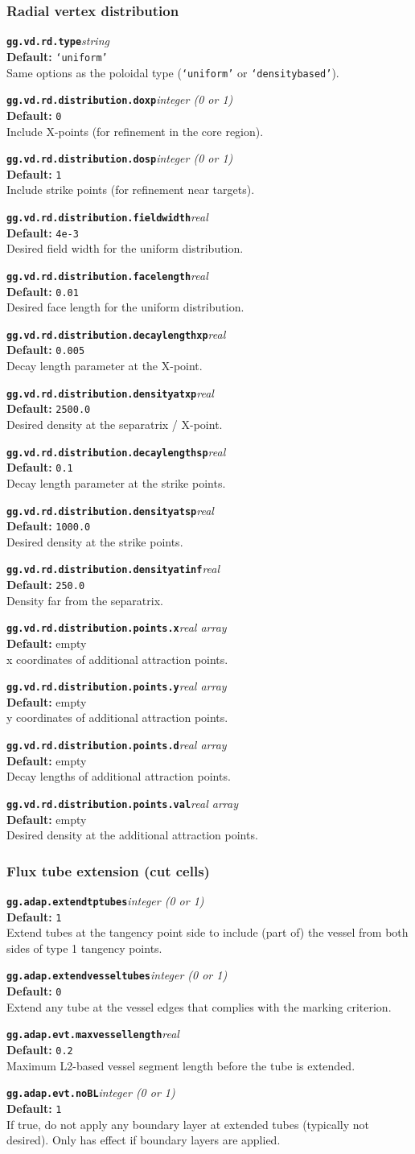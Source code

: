 \documentclass[10pt,a4paper]{article}
\newcommand{\sw}[4]{%
  \par\vspace{0.7em}%
  \begin{minipage}{\linewidth}\raggedright
    \textbf{\texttt{#1}}\hfill\textit{#2}\\[0.1em]
    \textbf{Default:} #3\\[0.1em]
    #4\par
    \vspace{0.3em}{\color{swgrey}\hrule}
  \end{minipage}\par}
\begin{document}
\subsubsection*{Radial vertex distribution}
\sw{gg.vd.rd.type}{string}{\texttt{`uniform'}}{Same options as the poloidal type (\texttt{`uniform'} or \texttt{`densitybased'}).}
\sw{gg.vd.rd.distribution.doxp}{integer (0 or 1)}{\texttt{0}}{Include X-points (for refinement in the core region).}
\sw{gg.vd.rd.distribution.dosp}{integer (0 or 1)}{\texttt{1}}{Include strike points (for refinement near targets).}
\sw{gg.vd.rd.distribution.fieldwidth}{real}{\texttt{4e-3}}{Desired field width for the uniform distribution.}
\sw{gg.vd.rd.distribution.facelength}{real}{\texttt{0.01}}{Desired face length for the uniform distribution.}
\sw{gg.vd.rd.distribution.decaylengthxp}{real}{\texttt{0.005}}{Decay length parameter at the X-point.}
\sw{gg.vd.rd.distribution.densityatxp}{real}{\texttt{2500.0}}{Desired density at the separatrix / X-point.}
\sw{gg.vd.rd.distribution.decaylengthsp}{real}{\texttt{0.1}}{Decay length parameter at the strike points.}
\sw{gg.vd.rd.distribution.densityatsp}{real}{\texttt{1000.0}}{Desired density at the strike points.}
\sw{gg.vd.rd.distribution.densityatinf}{real}{\texttt{250.0}}{Density far from the separatrix.}
\sw{gg.vd.rd.distribution.points.x}{real array}{empty}{x coordinates of additional attraction points.}
\sw{gg.vd.rd.distribution.points.y}{real array}{empty}{y coordinates of additional attraction points.}
\sw{gg.vd.rd.distribution.points.d}{real array}{empty}{Decay lengths of additional attraction points.}
\sw{gg.vd.rd.distribution.points.val}{real array}{empty}{Desired density at the additional attraction points.}

\subsubsection*{Flux tube extension (cut cells)}
\sw{gg.adap.extendtptubes}{integer (0 or 1)}{\texttt{1}}{Extend tubes at the tangency point side to include (part of) the vessel from both sides of type 1 tangency points.}
\sw{gg.adap.extendvesseltubes}{integer (0 or 1)}{\texttt{0}}{Extend any tube at the vessel edges that complies with the marking criterion.}
\sw{gg.adap.evt.maxvessellength}{real}{\texttt{0.2}}{Maximum L2-based vessel segment length before the tube is extended.}
\sw{gg.adap.evt.noBL}{integer (0 or 1)}{\texttt{1}}{If true, do not apply any boundary layer at extended tubes (typically not desired). Only has effect if boundary layers are applied.}
\end{document}
